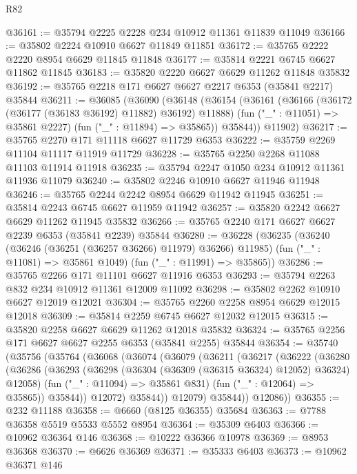 \begin{lexlean}{R82}
\begin{coremodule}
@36161 := @35794 @2225 @2228 @234 @10912 @11361 @11839 @11049
@36166 := @35802 @2224 @10910 @6627 @11849 @11851
@36172 := @35765 @2222 @2220 @8954 @6629 @11845 @11848
@36177 := @35814 @2221 @6745 @6627 @11862 @11845
@36183 := @35820 @2220 @6627 @6629 @11262 @11848 @35832
@36192 := @35765 @2218 @171 @6627 @6627 @2217 @6353 (@35841 @2217) @35844
@36211 := @36085
    (@36090
      (@36148
        (@36154
          (@36161
            (@36166 (@36172 (@36177 (@36183 @36192) @11882) @36192) @11888)
            (fun ("_" : @11051) => @35861 @2227)
            (fun ("_" : @11894) => @35865))
          @35844))
      @11902)
@36217 := @35765 @2270 @171 @11118 @6627 @11729 @6353
@36222 := @35759 @2269 @11104 @11117 @11919 @11729
@36228 := @35765 @2250 @2268 @11088 @11103 @11914 @11918
@36235 := @35794 @2247 @1050 @234 @10912 @11361 @11936 @11079
@36240 := @35802 @2246 @10910 @6627 @11946 @11948
@36246 := @35765 @2244 @2242 @8954 @6629 @11942 @11945
@36251 := @35814 @2243 @6745 @6627 @11959 @11942
@36257 := @35820 @2242 @6627 @6629 @11262 @11945 @35832
@36266 := @35765 @2240 @171 @6627 @6627 @2239 @6353 (@35841 @2239) @35844
@36280 := @36228
    (@36235
      (@36240 (@36246 (@36251 (@36257 @36266) @11979) @36266) @11985)
      (fun ("_" : @11081) => @35861 @1049)
      (fun ("_" : @11991) => @35865))
@36286 := @35765 @2266 @171 @11101 @6627 @11916 @6353
@36293 := @35794 @2263 @832 @234 @10912 @11361 @12009 @11092
@36298 := @35802 @2262 @10910 @6627 @12019 @12021
@36304 := @35765 @2260 @2258 @8954 @6629 @12015 @12018
@36309 := @35814 @2259 @6745 @6627 @12032 @12015
@36315 := @35820 @2258 @6627 @6629 @11262 @12018 @35832
@36324 := @35765 @2256 @171 @6627 @6627 @2255 @6353 (@35841 @2255) @35844
@36354 := @35740
    (@35756
      (@35764
        (@36068
          (@36074
            (@36079
              (@36211
                (@36217
                  (@36222
                    (@36280
                      (@36286
                        (@36293
                          (@36298 (@36304 (@36309 (@36315 @36324) @12052) @36324) @12058)
                          (fun ("_" : @11094) => @35861 @831)
                          (fun ("_" : @12064) => @35865))
                        @35844))
                    @12072)
                  @35844))
              @12079)
            @35844))
        @12086))
@36355 := @232 @11188
@36358 := @6660 (@8125 @36355) @35684
@36363 := @7788 @36358 @5519 @5533 @5552 @8954
@36364 := @35309 @6403
@36366 := @10962 @36364 @146
@36368 := @10222 @36366 @10978
@36369 := @8953 @36368
@36370 := @6626 @36369
@36371 := @35333 @6403
@36373 := @10962 @36371 @146

\end{coremodule}
\end{lexlean}
